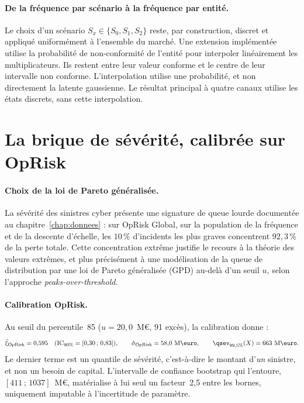 \paragraph{De la fréquence par scénario à la fréquence par entité.} Le choix
d'un scénario $S_x \in \{S_0, S_1, S_2\}$ reste, par construction, discret et
appliqué uniformément à l'ensemble du marché. Une extension implémentée utilise la probabilité de non-conformité de l'entité
pour interpoler linéairement les multiplicateurs. Ils restent entre leur valeur conforme et le centre de leur intervalle non conforme.
L'interpolation utilise une probabilité, et non directement la latente gaussienne.
Le résultat principal à quatre canaux utilise les états discrets, sans cette interpolation.



\section{La brique de sévérité, calibrée sur OpRisk}


\paragraph{Choix de la loi de Pareto généralisée.} La sévérité des sinistres
cyber présente une signature de queue lourde documentée au chapitre~\ref{chap:donnees} : sur
OpRisk Global, sur la population de la fréquence et de la descente d'échelle, les $10\,\%$ d'incidents les plus
graves concentrent $92{,}3\,\%$
de la perte totale. Cette concentration extrême justifie le recours à la
théorie des valeurs extrêmes, et plus précisément à une modélisation de la
queue de distribution par une loi de Pareto généralisée (GPD) au-delà d'un
seuil $u$, selon l'approche \emph{peaks-over-threshold}.

\paragraph{Calibration OpRisk.} Au seuil du percentile~85
($u = 20{,}0$~M\euro, 91 excès), la calibration donne :
\begin{equation}
\hat{\xi}_{\text{OpRisk}} = 0{,}595 \quad (\text{IC}_{90\%}=[0{,}30\,;\,0{,}83]),
\qquad
\hat{\sigma}_{\text{OpRisk}} = 58{,}0~\text{M\euro},
\qquad
\qsev_{99{,}5\%}(X) = 663~\text{M\euro}.
\end{equation}
Le dernier terme est un quantile de sévérité, c'est-à-dire le montant d'\emph{un}
sinistre, et non un besoin de capital. L'intervalle de confiance bootstrap qui l'entoure,
$[411\,;\,1037]$~M\euro, matérialise à lui seul un facteur~2{,}5 entre les bornes, uniquement
imputable à l'incertitude de paramètre.

